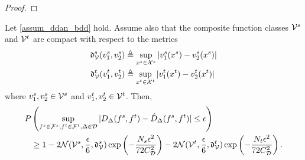\documentclass[review,supplement,onefignum,onetabnum]{siamonline250211}
\begin{document}
\begin{proof}
 
\end{proof}




\begin{lemma}
    \label{lem_ddan_hddan_dev}
    Let \cref{assum_ddan_bdd} hold. Assume also that the composite function classes $\mathcal{V}^s$ and $\mathcal{V}^t$ are compact with respect to the metrics 
    \begin{equation*}
    \begin{split}
    \mathfrak{d}^s_{\mathcal{V}} (v^s_1, v^s_2) & \triangleq \sup_{x^s \in \mathcal{X}^s}  | v^s_1(x^s) - v^s_2(x^s) | \\
    \mathfrak{d}^t_{\mathcal{V}} (v^t_1, v^t_2) & \triangleq \sup_{x^t \in \mathcal{X}^t}  | v^t_1(x^t) - v^t_2(x^t) | \\
    \end{split}
    \end{equation*}
    where $v^s_1, v^s_2 \in \mathcal{V}^s$ and $v^t_1, v^t_2 \in \mathcal{V}^t$.
    Then,  
    \begin{equation*}
    \begin{split}
    P & \left(
    \sup_{f^s \in \mathcal{F}^s, f^t \in \mathcal{F}^t, \Delta \in \mathcal{D}} 
     |  D_{\Delta}(f^s, f^t)  - \hat{D}_{\Delta}(f^s, f^t)  | \leq  \epsilon
     \right ) \\
    & \geq
     1 - 2 \mathcal{N}(\mathcal{V}^s, \frac{\epsilon}{6}, \mathfrak{d}^s_{\mathcal{V}} )  \exp \left( -\frac{N_s \epsilon^2}{72 {C^2_{\mathcal{D}}}} \right) 
    - 2 \mathcal{N}(\mathcal{V}^t, \frac{\epsilon}{6}, \mathfrak{d}^t_{\mathcal{V}} ) \exp \left( -\frac{N_t \epsilon^2}{72 {C^2_{\mathcal{D}}}} \right) .
    \end{split}
    \end{equation*}
\end{lemma}
    
\end{document}
